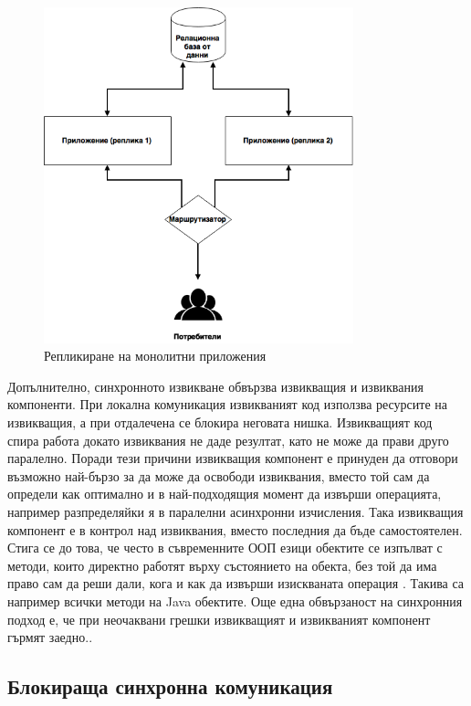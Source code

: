 \begin{figure}
  \centering\includegraphics[width=0.8\textwidth]{images/monolithic-application-replication.png}
  \caption{Репликиране на монолитни приложения}
  \label{fig:monolithic-replication}
\end{figure}

Допълнително, синхронното извикване обвързва извикващия и извиквания компоненти. При локална комуникация извикваният код използва ресурсите на извикващия, а при отдалечена се блокира неговата нишка. Извикващият код спира работа докато извиквания не даде резултат, като не може да прави друго паралелно. Поради тези причини извикващия компонент е принуден да отговори възможно най-бързо за да може да освободи извиквания, вместо той сам да определи как оптимално и в най-подходящия момент да извърши операцията, например разпределяйки я в паралелни асинхронни изчисления. Така извикващия компонент е в контрол над извиквания, вместо последния да бъде самостоятелен. Стига се до това, че често в съвременните ООП езици обектите се изпълват с методи, които директно работят върху състоянието на обекта, без той да има право сам да реши дали, кога и как да извърши изискваната операция \cite{kuhn2015ReactiveDesignPatterns}. Такива са например всички  методи на Java обектите. Още една обвързаност на синхронния подход е, че при неочаквани грешки извикващият и извикваният компонент гърмят заедно..

\subsection{Блокираща синхронна комуникация}

